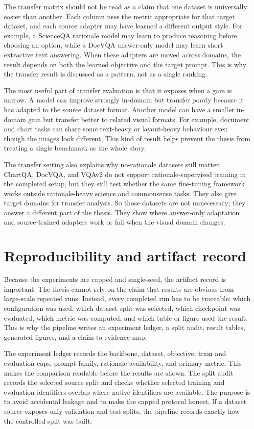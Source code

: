 \documentclass[12pt,bibliography=totoc,listof=totoc,BCOR=5mm,DIV=12,oneside,open=any]{scrbook}
\begin{document}
The transfer matrix should not be read as a claim that one dataset is universally easier than another.
Each column uses the metric appropriate for that target dataset, and each source adapter may have learned a different output style.
For example, a ScienceQA rationale model may learn to produce reasoning before choosing an option, while a DocVQA answer-only model may learn short extractive text answering.
When these adapters are moved across domains, the result depends on both the learned objective and the target prompt.
This is why the transfer result is discussed as a pattern, not as a single ranking.

The most useful part of transfer evaluation is that it exposes when a gain is narrow.
A model can improve strongly in-domain but transfer poorly because it has adapted to the source dataset format.
Another model can have a smaller in-domain gain but transfer better to related visual formats.
For example, document and chart tasks can share some text-heavy or layout-heavy behaviour even though the images look different.
This kind of result helps prevent the thesis from treating a single benchmark as the whole story.

The transfer setting also explains why no-rationale datasets still matter.
ChartQA, DocVQA, and VQAv2 do not support rationale-supervised training in the completed setup, but they still test whether the same fine-tuning framework works outside rationale-heavy science and commonsense tasks.
They also give target domains for transfer analysis.
So those datasets are not unnecessary; they answer a different part of the thesis.
They show where answer-only adaptation and source-trained adapters work or fail when the visual domain changes.

\section{Reproducibility and artifact record}
Because the experiments are capped and single-seed, the artifact record is important.
The thesis cannot rely on the claim that results are obvious from large-scale repeated runs.
Instead, every completed run has to be traceable: which configuration was used, which dataset split was selected, which checkpoint was evaluated, which metric was computed, and which table or figure used the result.
This is why the pipeline writes an experiment ledger, a split audit, result tables, generated figures, and a claim-to-evidence map.

The experiment ledger records the backbone, dataset, objective, train and evaluation caps, prompt family, rationale availability, and primary metric.
This makes the comparison readable before the results are shown.
The split audit records the selected source split and checks whether selected training and evaluation identifiers overlap where native identifiers are available.
The purpose is to avoid accidental leakage and to make the capped protocol honest.
If a dataset source exposes only validation and test splits, the pipeline records exactly how the controlled split was built.
\end{document}
